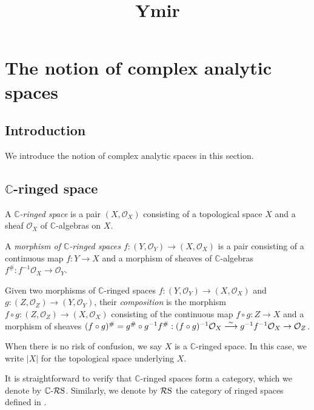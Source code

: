 




\title{Ymir}









\maketitle


\tableofcontents

\chapter*{The notion of complex analytic spaces}\label{chap-complex}

\section{Introduction}\label{sec-introduction-Complexanalyticspaces}
We introduce the notion of complex analytic spaces in this section.

\section{\texorpdfstring{$\mathbb{C}$}{C}-ringed space}

\begin{definition}
    A \emph{$\mathbb{C}$-ringed space} is a pair $(X,\mathcal{O}_X)$ consisting of a topological space $X$ and a sheaf $\mathcal{O}_X$ of $\mathbb{C}$-algebras on $X$.

    A \emph{morphism of $\mathbb{C}$-ringed spaces $f:(Y,\mathcal{O}_Y)\rightarrow (X,\mathcal{O}_X)$} is a pair consisting of a continuous map $f:Y\rightarrow X$ and a morphism of sheaves of $\mathbb{C}$-algebras $f^{\#}:f^{-1}\mathcal{O}_X\rightarrow \mathcal{O}_Y$.

    Given two morphisms of $\mathbb{C}$-ringed spaces $f:(Y,\mathcal{O}_Y)\rightarrow (X,\mathcal{O}_X)$ and $g:(Z,\mathcal{O}_Z)\rightarrow (Y,\mathcal{O}_Y)$, their \emph{composition} is the morphism $f\circ g:(Z,\mathcal{O}_Z)\rightarrow (X,\mathcal{O}_X)$ consisting of the continuous map $f\circ g:Z\rightarrow X$ and a morphism of sheaves $(f\circ g)^{\#}=g^{\#}\circ g^{-1}f^{\#}:(f\circ g)^{-1}\mathcal{O}_X\stackrel{\sim}{\longrightarrow} g^{-1}f^{-1}\mathcal{O}_X\rightarrow \mathcal{O}_Z$.

    When there is no risk of confusion, we say $X$ is a $\mathbb{C}$-ringed space. In this case, we write $|X|$ for the topological space underlying $X$.
\end{definition}
It is straightforward to verify that $\mathbb{C}$-ringed spaces form a category, which we denote by $\mathbb{C}\text{-}\mathcal{R}\mathrm{S}$.
Similarly, we denote by $\mathcal{R}\mathrm{S}$ the category of ringed spaces defined in \cite[\href{https://stacks.math.columbia.edu/tag/0090}{Tag 0090}]{stacks-project}.

